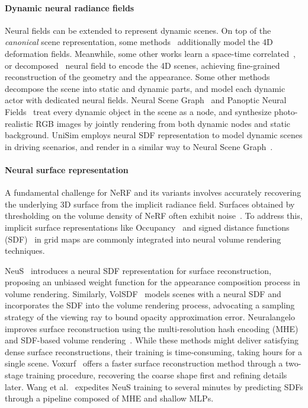 \paragraph{Dynamic neural radiance fields} 
Neural fields \cite{xie2022neural} can be extended to represent dynamic scenes. On top of the \textit{canonical} scene representation, some methods~\cite{pumarola2020d, park2021nerfies, park2021hypernerf,yuan2021star} additionally model the 4D deformation fields. Meanwhile, some other works learn a space-time correlated~\cite{kplanes_2023, li2020neural, attal2023hyperreel, liu2023robust}, or decomposed~\cite{turki2023suds,wu2022d,yang2023emernerf} neural field to encode the 4D scenes, achieving fine-grained reconstruction of the geometry and the appearance.
%
Some other methods decompose the scene into static and dynamic parts, and model each dynamic actor with dedicated neural fields. 
Neural Scene Graph~\cite{Ost_2021_CVPR} and Panoptic Neural Fields~\cite{KunduCVPR2022PNF} treat every dynamic object in the scene as a node, and synthesize photo-realistic RGB images by jointly rendering from both dynamic nodes and static background. UniSim\cite{yang2023unisim} employs neural SDF representation to model dynamic scenes in driving scenarios, and render in a similar way to Neural Scene Graph~\cite{Ost_2021_CVPR}.


\paragraph{Neural surface representation}
A fundamental challenge for NeRF and its variants involves accurately recovering the underlying 3D surface from the implicit radiance field. Surfaces obtained by thresholding on the volume density of NeRF often exhibit noise~\cite{wang2021neus, yariv2021volume}. To address this, implicit surface representations like Occupancy~\cite{niemeyer2020differentiable, oechsle2021unisurf} and signed distance functions (SDF)~\cite{wang2021neus, yariv2021volume, yu2022monosdf, sun2022neural, wang2022hf, zuo2023incremental, li2023neuralangelo, wang2023neus2} in grid maps are commonly integrated into neural volume rendering techniques.

NeuS~\cite{wang2021neus} introduces a neural SDF representation for surface reconstruction, proposing an unbiased weight function for the appearance composition process in volume rendering. Similarly, VolSDF~\cite{yariv2021volume} models scenes with a neural SDF and incorporates the SDF into the volume rendering process, advocating a sampling strategy of the viewing ray to bound opacity approximation error. Neuralangelo~\cite{li2023neuralangelo} improves surface reconstruction using the multi-resolution hash encoding (MHE)~\cite{mueller2022instant} and SDF-based volume rendering~\cite{wang2021neus}. While these methods might deliver satisfying dense surface reconstructions, their training is time-consuming, taking hours for a single scene.
Voxurf~\cite{wu2022voxurf} offers a faster surface reconstruction method through a two-stage training procedure, recovering the coarse shape first and refining details later. Wang et al.~\cite{wang2023neus2} expedites NeuS training to several minutes by predicting SDFs through a pipeline composed of MHE and shallow MLPs.

